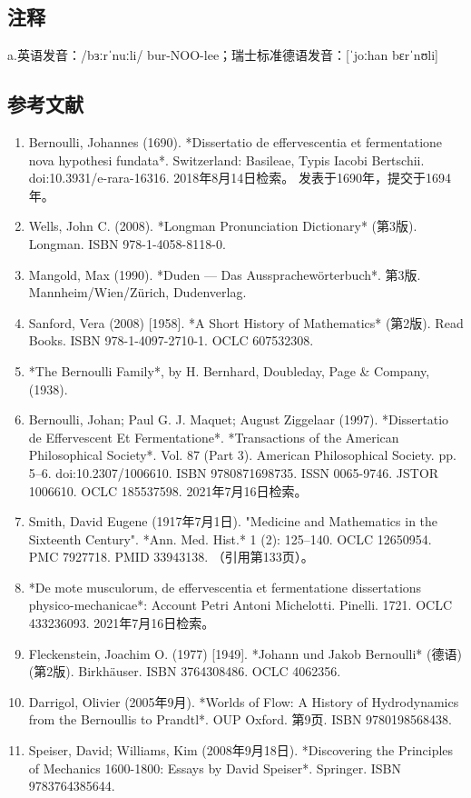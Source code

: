 \subsection{注释}  
a.英语发音：/bɜːrˈnuːli/ bur-NOO-lee；瑞士标准德语发音：[ˈjoːhan bɛrˈnʊli]
\subsection{参考文献}  
\begin{enumerate}
\item Bernoulli, Johannes (1690). *Dissertatio de effervescentia et fermentatione nova hypothesi fundata*. Switzerland: Basileae, Typis Iacobi Bertschii. doi:10.3931/e-rara-16316. 2018年8月14日检索。  
  发表于1690年，提交于1694年。  
\item Wells, John C. (2008). *Longman Pronunciation Dictionary* (第3版). Longman. ISBN 978-1-4058-8118-0.  
\item Mangold, Max (1990). *Duden — Das Aussprachewörterbuch*. 第3版. Mannheim/Wien/Zürich, Dudenverlag.  
\item Sanford, Vera (2008) [1958]. *A Short History of Mathematics* (第2版). Read Books. ISBN 978-1-4097-2710-1. OCLC 607532308.  
\item *The Bernoulli Family*, by H. Bernhard, Doubleday, Page & Company, (1938).  
\item Bernoulli, Johan; Paul G. J. Maquet; August Ziggelaar (1997). *Dissertatio de Effervescent Et Fermentatione*. *Transactions of the American Philosophical Society*. Vol. 87 (Part 3). American Philosophical Society. pp. 5–6. doi:10.2307/1006610. ISBN 9780871698735. ISSN 0065-9746. JSTOR 1006610. OCLC 185537598. 2021年7月16日检索。  
\item Smith, David Eugene (1917年7月1日). "Medicine and Mathematics in the Sixteenth Century". *Ann. Med. Hist.* 1 (2): 125–140. OCLC 12650954. PMC 7927718. PMID 33943138. （引用第133页）。  
\item *De mote musculorum, de effervescentia et fermentatione dissertations physico-mechanicae*: Account Petri Antoni Michelotti. Pinelli. 1721. OCLC 433236093. 2021年7月16日检索。  
\item Fleckenstein, Joachim O. (1977) [1949]. *Johann und Jakob Bernoulli* (德语) (第2版). Birkhäuser. ISBN 3764308486. OCLC 4062356.  
\item Darrigol, Olivier (2005年9月). *Worlds of Flow: A History of Hydrodynamics from the Bernoullis to Prandtl*. OUP Oxford. 第9页. ISBN 9780198568438.  
\item Speiser, David; Williams, Kim (2008年9月18日). *Discovering the Principles of Mechanics 1600-1800: Essays by David Speiser*. Springer. ISBN 9783764385644.  

\end{enumerate}
